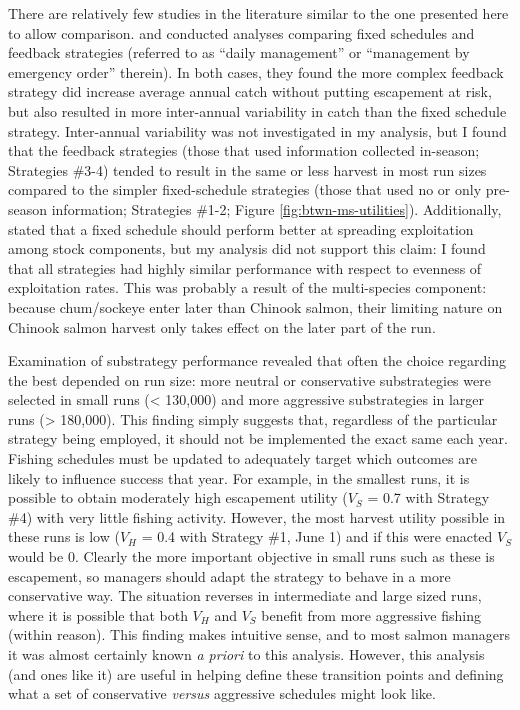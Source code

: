 \documentclass[12pt,]{book}
\theoremstyle{definition}
\theoremstyle{definition}
\theoremstyle{definition}
\theoremstyle{remark}
\begin{document}
There are relatively few studies in the literature similar to the one
presented here to allow comparison. \citet{carney-adkison-2014a} and
\citet{carney-adkison-2014b} conducted analyses comparing fixed
schedules and feedback strategies (referred to as ``daily management''
or ``management by emergency order'' therein). In both cases, they found
the more complex feedback strategy did increase average annual catch
without putting escapement at risk, but also resulted in more
inter-annual variability in catch than the fixed schedule strategy.
Inter-annual variability was not investigated in my analysis, but I
found that the feedback strategies (those that used information
collected in-season; Strategies \#3-4) tended to result in the same or
less harvest in most run sizes compared to the simpler fixed-schedule
strategies (those that used no or only pre-season information;
Strategies \#1-2; Figure \ref{fig:btwn-ms-utilities}). Additionally,
\citet{carney-adkison-2014a} stated that a fixed schedule should perform
better at spreading exploitation among stock components, but my analysis
did not support this claim: I found that all strategies had highly
similar performance with respect to evenness of exploitation rates. This
was probably a result of the multi-species component: because
chum/sockeye enter later than Chinook salmon, their limiting nature on
Chinook salmon harvest only takes effect on the later part of the run.

Examination of substrategy performance revealed that often the choice
regarding the best depended on run size: more neutral or conservative
substrategies were selected in small runs (\textless{} 130,000) and more
aggressive substrategies in larger runs (\textgreater{} 180,000). This
finding simply suggests that, regardless of the particular strategy
being employed, it should not be implemented the exact same each year.
Fishing schedules must be updated to adequately target which outcomes
are likely to influence success that year. For example, in the smallest
runs, it is possible to obtain moderately high escapement utility
(\(V_S\) = 0.7 with Strategy \#4) with very little fishing activity.
However, the most harvest utility possible in these runs is low (\(V_H\)
= 0.4 with Strategy \#1, June 1) and if this were enacted \(V_S\) would
be 0. Clearly the more important objective in small runs such as these
is escapement, so managers should adapt the strategy to behave in a more
conservative way. The situation reverses in intermediate and large sized
runs, where it is possible that both \(V_H\) and \(V_S\) benefit from
more aggressive fishing (within reason). This finding makes intuitive
sense, and to most salmon managers it was almost certainly known \emph{a
priori} to this analysis. However, this analysis (and ones like it) are
useful in helping define these transition points and defining what a set
of conservative \emph{versus} aggressive schedules might look like.
\end{document}

